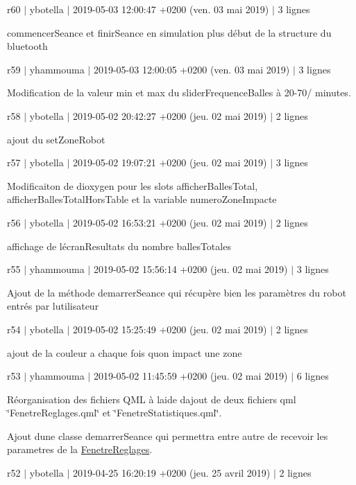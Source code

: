 r60 $\vert$ ybotella $\vert$ 2019-\/05-\/03 12\+:00\+:47 +0200 (ven. 03 mai 2019) $\vert$ 3 lignes

commencer\+Seance et finir\+Seance en simulation plus début de la structure du bluetooth

r59 $\vert$ yhammouma $\vert$ 2019-\/05-\/03 12\+:00\+:05 +0200 (ven. 03 mai 2019) $\vert$ 3 lignes

Modification de la valeur min et max du slider\+Frequence\+Balles à 20-\/70/ minutes.

r58 $\vert$ ybotella $\vert$ 2019-\/05-\/02 20\+:42\+:27 +0200 (jeu. 02 mai 2019) $\vert$ 2 lignes

ajout du set\+Zone\+Robot

r57 $\vert$ ybotella $\vert$ 2019-\/05-\/02 19\+:07\+:21 +0200 (jeu. 02 mai 2019) $\vert$ 3 lignes

Modificaiton de dioxygen pour les slots afficher\+Balles\+Total, afficher\+Balles\+Total\+Hors\+Table et la variable numero\+Zone\+Impacte

r56 $\vert$ ybotella $\vert$ 2019-\/05-\/02 16\+:53\+:21 +0200 (jeu. 02 mai 2019) $\vert$ 2 lignes

affichage de l\textquotesingle{}écran\+Resultats du nombre balles\+Totales

r55 $\vert$ yhammouma $\vert$ 2019-\/05-\/02 15\+:56\+:14 +0200 (jeu. 02 mai 2019) $\vert$ 3 lignes

Ajout de la méthode demarrer\+Seance qui récupère bien les paramètres du robot entrés par l\textquotesingle{}utilisateur

r54 $\vert$ ybotella $\vert$ 2019-\/05-\/02 15\+:25\+:49 +0200 (jeu. 02 mai 2019) $\vert$ 2 lignes

ajout de la couleur a chaque fois qu\textquotesingle{}on impact une zone

r53 $\vert$ yhammouma $\vert$ 2019-\/05-\/02 11\+:45\+:59 +0200 (jeu. 02 mai 2019) $\vert$ 6 lignes

Réorganisation des fichiers Q\+ML à l\textquotesingle{}aide d\textquotesingle{}ajout de deux fichiers qml \char`\"{}\+Fenetre\+Reglages.\+qml\char`\"{} et \char`\"{}\+Fenetre\+Statistiques.\+qml\char`\"{}.

Ajout d\textquotesingle{}une classe demarrer\+Seance qui permettra entre autre de recevoir les parametres de la \hyperlink{class_fenetre_reglages}{Fenetre\+Reglages}.

r52 $\vert$ ybotella $\vert$ 2019-\/04-\/25 16\+:20\+:19 +0200 (jeu. 25 avril 2019) $\vert$ 2 lignes

